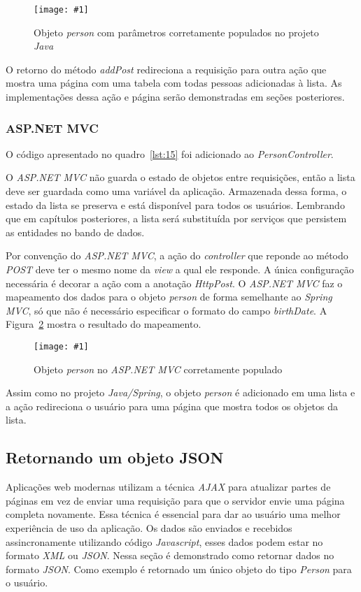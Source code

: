 \documentclass[a4paper,12pt]{article}
\newcommand{\figura}[3] {
	\begin{figure}[ht]
		\centering
		\texttt{[image: \#1]}
		\caption{#2}
		\label{#3}
	\end{figure}
	\FloatBarrier
}
\newcommand{\est}[1] {
\textit{#1}}
\newcommand{\classe}[1] {
\textit{#1}}
\newcommand{\sigla}[1] {
\textit{#1}}
\newcommand{\lang}[1] {
\textit{#1}}
\newcommand{\annotation}[1] {
\textit{#1}}
\newcommand{\metodo}[1] {
\textit{#1}}
\newcommand{\sharpcode}[3] {
	
}
\begin{document}
\figura{30.png}{Objeto \est{person} com parâmetros corretamente populados no projeto \lang{Java}}{fig:30}

O retorno do método \metodo{addPost} redireciona a requisição para outra ação que mostra uma página com uma tabela com todas pessoas adicionadas à lista. As implementações dessa ação e página serão demonstradas em seções posteriores.

\subsubsection{ASP.NET MVC}

O código apresentado no quadro~\ref{lst:15} foi adicionado ao \classe{PersonController}.

\sharpcode{code/15.txt}{\classe{PersonController} do projeto \est{ASP.NET} com nova ação}{lst:15}

O \est{ASP.NET MVC} não guarda o estado de objetos entre requisições, então a lista deve ser guardada como uma variável da aplicação. Armazenada dessa forma, o estado da lista se preserva e está disponível para todos os usuários. Lembrando que em capítulos posteriores, a lista será substituída por serviços que persistem as entidades no bando de dados.

Por convenção do \est{ASP.NET MVC}, a ação do \est{controller} que reponde ao método \est{POST} deve ter o mesmo nome da \est{view} a qual ele responde.  A única configuração necessária é decorar a ação com a anotação \annotation{HttpPost}. O \est{ASP.NET MVC} faz o mapeamento dos dados para o objeto \est{person} de forma semelhante ao \est{Spring MVC}, só que não é necessário especificar o formato do campo \est{birthDate}. A Figura~\ref{fig:31} mostra o resultado do mapeamento.

\figura{31.png}{Objeto \est{person} no \est{ASP.NET MVC} corretamente populado}{fig:31}

Assim como no projeto \est{Java/Spring}, o objeto \est{person} é adicionado em uma lista e a ação redireciona o usuário para uma página que mostra todos os objetos da lista.

\subsection{Retornando um objeto JSON}

Aplicações web modernas utilizam a técnica \sigla{AJAX} para atualizar partes de páginas em vez de enviar uma requisição para que o servidor envie uma página completa novamente. Essa técnica é essencial para dar ao usuário uma melhor experiência de uso da aplicação. Os dados são enviados e recebidos assincronamente utilizando código \lang{Javascript}, esses dados podem estar no formato \sigla{XML} ou \sigla{JSON}. Nessa seção é demonstrado como retornar dados no formato \sigla{JSON}. Como exemplo é retornado um único objeto do tipo \classe{Person} para o usuário.
\end{document}

